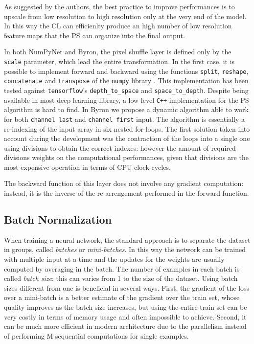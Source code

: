 \documentclass[12pt,a4paper]{report}
\begin{document}
As suggested by the authors, the best practice to improve performances is to upscale from low resolution to high resolution only at the very end of the model. 
In this way the CL can efficienlty produce an high number of low resolution feature maps that the PS can organize into the final output. 

In both NumPyNet and Byron, the pixel shuffle layer is defined only by the \texttt{scale} parameter, which lead the entire transformation.
In the first case, it is possible to implement forward and backward using the functions \texttt{split}, \texttt{reshape}, \texttt{concatenate} and \texttt{transpose} of the \texttt{numpy} library \cite{Numpy}. 
This implementation has been tested against \texttt{tensorflow}'s \texttt{depth\_to\_space} and \texttt{space\_to\_depth}.
Despite being available in most deep learning library, a low level  \texttt{C++} implementation for the PS algorithm is hard to find. 
In Byron we propose a dynamic algorithm able to work for both \texttt{channel last} and \texttt{channel first} input. 
The algorithm is essentially a re-indexing of the input array in six nested for-loops. The first solution taken into account during the development was the contraction of the loops into a single one using divisions to obtain the correct indexes: however the amount of required divisions weights on the computational performances, given that divisions are the most expensive operation in terms of CPU clock-cycles. 

The backward function of this layer does not involve any gradient computation: instead, it is the inverse of the re-arrengement performed in the forward function.

\subsection*{Batch Normalization}

When training a neural network, the standard approach is to separate the dataset in groups, called {\it batches} or {\it mini-batches}. 
In this way the network can be trained with multiple input at a time and the updates for the weights are usually computed by averaging in the batch.
The number of examples in each batch is called \textit{batch size}: this can varies from 1 to the size of the dataset. 
Using batch sizes different from one is beneficial in several ways. 
First, the gradient of the loss over a mini-batch is a better estimate of the gradient over the train set, whose quality improves as the batch size increases, but using the entire train set can be very costly in terms of memory usage and often impossible to achieve.
Second, it can be much more efficient in modern architecture due to the  parallelism instead of performing M sequential computations for single examples. \cite{batchnorm}
\end{document}
